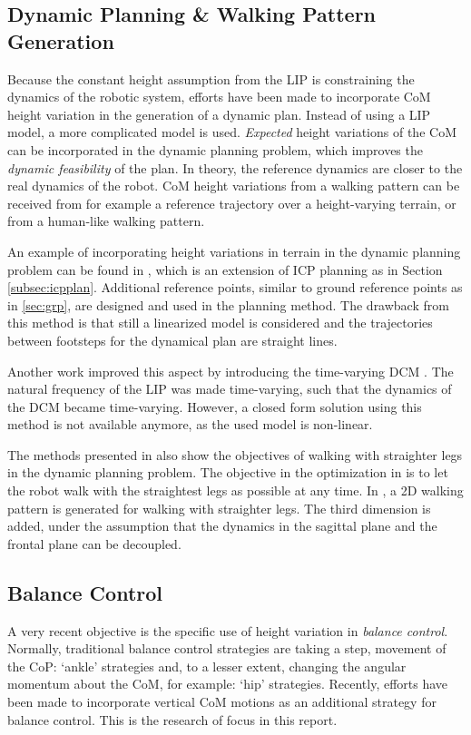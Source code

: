 \subsection{Dynamic Planning \& Walking Pattern Generation}
Because the constant height assumption from the \ac{LIP} is constraining the dynamics of the robotic system, efforts have been made to incorporate CoM height variation in the generation of a dynamic plan. Instead of using a LIP model, a more complicated model is used. \textit{Expected} height variations of the CoM can be incorporated in the dynamic planning problem, which improves the \textit{dynamic feasibility} of the plan. In theory, the reference dynamics are closer to the real dynamics of the robot. \ac{CoM} height variations from a walking pattern can be received from for example a reference trajectory over a height-varying terrain, or from a human-like walking pattern. 

An example of incorporating height variations in terrain in the dynamic planning problem can be found in \cite{englsberger2013three}, which is an extension of \ac{ICP} planning as in Section \ref{subsec:icpplan}. Additional reference points, similar to ground reference points as in \ref{sec:grp}, are designed and used in the planning method. The drawback from this method is that still a linearized model is considered and the trajectories between footsteps for the dynamical plan are straight lines. 

Another work improved this aspect by introducing the time-varying \ac{DCM} \cite{hopkins2014humanoid}. The natural frequency of the \ac{LIP} was made time-varying, such that the dynamics of the \ac{DCM} became time-varying. However, a closed form solution using this method is not available anymore, as the used model is non-linear.

The methods presented in \cite{brasseur2015robust} \cite{kajita2017biped} also show the objectives of walking with straighter legs in the dynamic planning problem. The objective in the optimization in \cite{brasseur2015robust} is to let the robot walk with the straightest legs as possible at any time. In \cite{kajita2017biped}, a \ac{2D} walking pattern is generated for walking with straighter legs. The third dimension is added, under the assumption that the dynamics in the sagittal plane and the frontal plane can be decoupled. 
\subsection{Balance Control}\label{subsec:heightbalance}
A very recent objective is the specific use of height variation in \textit{balance control}. Normally, traditional balance control strategies are taking a step, movement of the \ac{CoP}: `ankle' strategies and, to a lesser extent, changing the angular momentum about the \ac{CoM}, for example: `hip' strategies. Recently, efforts have been made to incorporate vertical \ac{CoM} motions as an additional strategy for balance control. This is the research of focus in this report.

